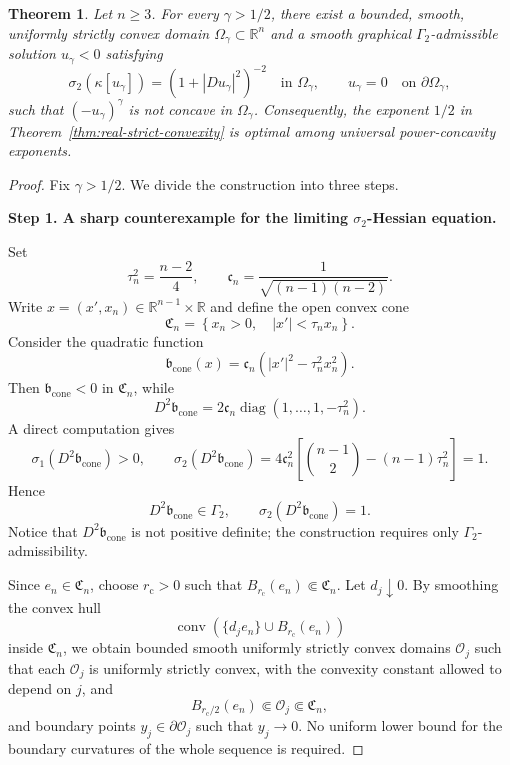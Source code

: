 \documentclass{article}
\newtheorem{theorem}{Theorem}[section]
\numberwithin{equation}{section}
\begin{document}
\begin{theorem}
\label{thm:real-square-root-optimality}
Let $n\ge3$. For every $\gamma>1/2$, there exist a bounded, smooth,
uniformly strictly convex domain
$\Omega_\gamma\subset\mathbb R^n$ and a smooth graphical
$\Gamma_2$-admissible solution $u_\gamma<0$ satisfying
\[
\sigma_2(\kappa[u_\gamma])
=
(1+|Du_\gamma|^2)^{-2}
\quad\text{in }\Omega_\gamma,
\qquad
u_\gamma=0
\quad\text{on }\partial\Omega_\gamma,
\]
such that $(-u_\gamma)^\gamma$ is not concave in $\Omega_\gamma$.
Consequently, the exponent $1/2$ in
Theorem~\ref{thm:real-strict-convexity} is optimal among universal
power-concavity exponents.
\end{theorem}

\begin{proof}
Fix $\gamma>1/2$. We divide the construction into three steps.

\medskip
\noindent\textbf{Step 1. A sharp counterexample for the limiting
$\sigma_2$-Hessian equation.}

Set
\[
\tau_n^2=\frac{n-2}{4},
\qquad
\mathfrak c_n=\frac{1}{\sqrt{(n-1)(n-2)}}.
\]
Write $x=(x',x_n)\in\mathbb R^{n-1}\times\mathbb R$ and define the
open convex cone
\begin{equation}
\label{eq:real-sharp-cone}
\mathfrak C_n
=
\left\{
x_n>0,\quad |x'|<\tau_n x_n
\right\}.
\end{equation}
Consider the quadratic function
\[
\mathfrak b_{\mathrm{cone}}(x)
=
\mathfrak c_n
\left(
|x'|^2-\tau_n^2x_n^2
\right).
\]
Then $\mathfrak b_{\mathrm{cone}}<0$ in $\mathfrak C_n$, while
\[
D^2\mathfrak b_{\mathrm{cone}}
=
2\mathfrak c_n
\operatorname{diag}
(1,\ldots,1,-\tau_n^2).
\]
A direct computation gives
\[
\sigma_1(D^2\mathfrak b_{\mathrm{cone}})>0,
\qquad
\sigma_2(D^2\mathfrak b_{\mathrm{cone}})
=
4\mathfrak c_n^2
\left[
\binom{n-1}{2}-(n-1)\tau_n^2
\right]
=1.
\]
Hence
\begin{equation}
\label{eq:real-sharp-cone-solution}
D^2\mathfrak b_{\mathrm{cone}}\in\Gamma_2,
\qquad
\sigma_2(D^2\mathfrak b_{\mathrm{cone}})=1.
\end{equation}
Notice that $D^2\mathfrak b_{\mathrm{cone}}$ is not positive
definite; the construction requires only $\Gamma_2$-admissibility.

Since $e_n\in\mathfrak C_n$, choose $r_{\mathrm c}>0$ such that
$B_{r_{\mathrm c}}(e_n)\Subset\mathfrak C_n$. Let
$d_j\downarrow0$. By smoothing the convex hull
\[
\operatorname{conv}
\left(
\{d_je_n\}\cup B_{r_{\mathrm c}}(e_n)
\right)
\]
inside $\mathfrak C_n$, we obtain bounded smooth uniformly strictly
convex domains $\mathcal O_j$ such that
each $\mathcal O_j$ is uniformly strictly convex, with the convexity constant allowed to depend on $j$, and
\begin{equation}
\label{eq:real-sharp-domains}
B_{r_{\mathrm c}/2}(e_n)
\Subset
\mathcal O_j
\Subset
\mathfrak C_n,
\end{equation}
and boundary points $y_j\in\partial\mathcal O_j$ such that
$y_j\to0$. No uniform lower bound for the boundary curvatures of the
whole sequence is required.


\end{proof}
\end{document}
